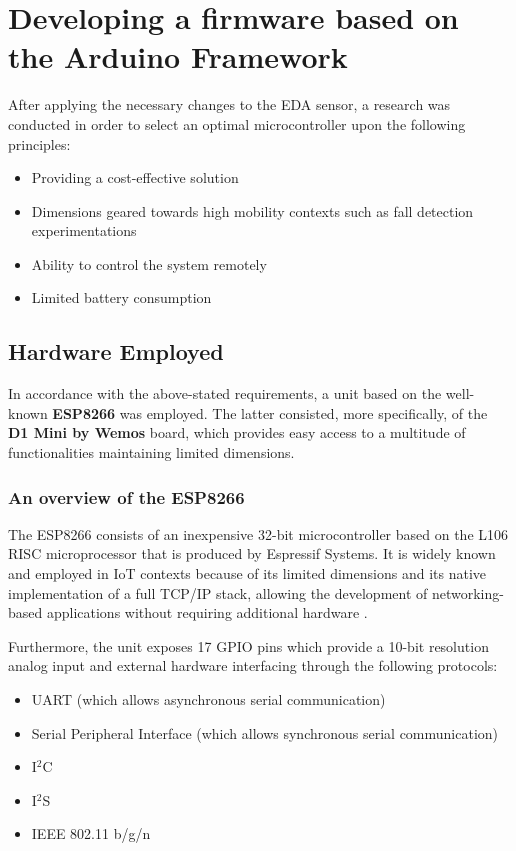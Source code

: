 \section{Developing a firmware based on the Arduino Framework}\label{sec:firmware}

After applying the necessary changes to the EDA sensor, a research was conducted in order to select an optimal microcontroller upon the following principles: 

\begin{itemize}
    \item Providing a cost-effective solution
    \item Dimensions geared towards high mobility contexts such as fall detection experimentations
    \item Ability to control the system remotely
    \item Limited battery consumption
\end{itemize}

\subsection{Hardware Employed}\label{sec:hardware-employed}

In accordance with the above-stated requirements, a unit based on the well-known \textbf{ESP8266} was employed. The latter consisted, more specifically, of the \textbf{D1 Mini by Wemos} board, which provides easy access to a multitude of functionalities maintaining limited dimensions.

\subsubsection{An overview of the ESP8266}\label{sec:esp8266}


The ESP8266 consists of an inexpensive 32-bit microcontroller based on the L106 RISC microprocessor that is produced by Espressif Systems. It is widely known and employed in IoT contexts because of its limited dimensions and its native implementation of a full TCP/IP stack, allowing the development of networking-based applications without requiring additional hardware \cite{esp8266}.

Furthermore, the unit exposes 17 GPIO pins which provide a 10-bit resolution analog input and external hardware interfacing through the following protocols:

\begin{itemize}
    \item UART (which allows asynchronous serial communication)
    \item Serial Peripheral Interface (which allows synchronous serial communication)
    \item I$^2$C
    \item I$^2$S
    \item IEEE 802.11 b/g/n
\end{itemize}

